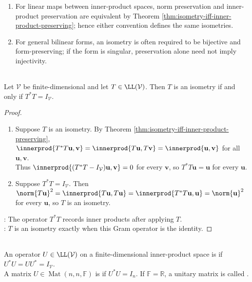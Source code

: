 \begin{remark} \label{rem:isometry-conventions} 
\begin{enumerate}[label=(\roman*)]
\setlength{\itemsep}{0pt}
\item For linear maps between inner-product spaces, norm preservation and inner-product preservation are equivalent by Theorem \ref{thm:isometry-iff-inner-product-preserving}; hence either convention defines the same isometries.
\item For general bilinear forms, an isometry is often required to be bijective and form-preserving; if the form is singular, preservation alone need not imply injectivity.
\end{enumerate}
\end{remark}

\begin{theorem} \label{thm:finite-dimensional-isometry-iff-adjoint-product-identity} \\
Let $\mathcal{V}$ be finite-dimensional and let $T\in\LL(\mathcal{V})$. Then $T$ is an isometry if and only if $T^*T=I_{\mathcal{V}}$.
\begin{proof}
\begin{enumerate}[label=\roman*.]
\setlength{\itemsep}{0pt}
\item[$(\Rightarrow)$] Suppose $T$ is an isometry. By Theorem \ref{thm:isometry-iff-inner-product-preserving}, $\innerprod{T^*T\mathbf{u},\mathbf{v}}=\innerprod{T\mathbf{u},T\mathbf{v}}=\innerprod{\mathbf{u},\mathbf{v}}$ for all $\mathbf{u},\mathbf{v}$.\\
Thus $\innerprod{(T^*T-I_{\mathcal{V}})\mathbf{u},\mathbf{v}}=0$ for every $\mathbf{v}$, so $T^*T\mathbf{u}=\mathbf{u}$ for every $\mathbf{u}$.
\item[$(\Leftarrow)$] Suppose $T^*T=I_{\mathcal{V}}$. Then $\norm{T\mathbf{u}}^2 =\innerprod{T\mathbf{u},T\mathbf{u}} =\innerprod{T^*T\mathbf{u},\mathbf{u}} =\norm{\mathbf{u}}^2$ for every $\mathbf{u}$, so $T$ is an isometry.
\end{enumerate}
: The operator $T^*T$ records inner products after applying $T$.\\
: $T$ is an isometry exactly when this Gram operator is the identity.
\end{proof}
\end{theorem}

\begin{definition} \label{def:unitary-operator-and-matrix} \\
An operator $U\in\LL(\mathcal{V})$ on a finite-dimensional inner-product space is  if $U^*U=UU^*=I_{\mathcal{V}}$.\\
A matrix $U\in\operatorname{Mat}(n,n,\mathbb{F})$ is  if $U^*U=I_n$. If $\mathbb{F}=\mathbb{R}$, a unitary matrix is called .
\end{definition}


